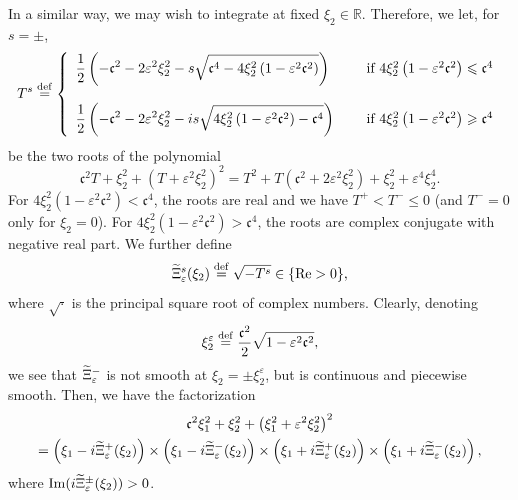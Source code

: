 \documentclass[AHL,Unicode,longabstracts,published]{cedram}
\newcommand*\R{\mathbb R}
\newcommand*\ddef{\stackrel{\rm def}{=}}
\newcommand{\Imm}{\mathrm{Im}}
\newcommand{\Rel}{\mathrm{Re}}
\newcommand*\ds{\displaystyle}
\newcommand*\cs{{\mathfrak c}}
\newcommand*\gs{\geqslant }
\newcommand*\ls{\leqslant }
\newcommand*\e{\varepsilon}
\renewcommand*\t{\tilde}
\let\oldtilde\tilde
\renewcommand*{\tilde}[1]{\mathchoice{\widetilde{#1}}{\widetilde{#1}}{\oldtilde{#1}}{\oldtilde{#1}}}
\begin{document}
In a similar way, we may wish to integrate at fixed $ \xi_2 \in \R $. Therefore, we let, for $ s = \pm $,
\[
T^s \ddef
\left\{
\begin{array}{ll}
\ds{ \frac{1}{2} \left(- \cs^2 - 2 \e^2 \xi_2^2 - s \sqrt{ \cs^4- 4 \xi_2^2 \left(1 - \e^2 \cs^2\right) } \right)} & \quad \text{ if } 4 \xi_2^2 \left(1 - \e^2 \cs^2\right) \ls \cs^4
\\ \ \\
\ds{ \frac{1}{2} \left(- \cs^2 - 2 \e^2 \xi_2^2 - i s \sqrt{ 4 \xi_2^2 \left(1 - \e^2 \cs^2\right) - \cs^4 } \right)} & \quad \text{ if } 4 \xi_2^2 \left(1 - \e^2 \cs^2\right) \gs \cs^4
\end{array}\right.
\]
be the two roots of the polynomial
\[
\cs^2 T + \xi_2^2 + \left(T + \e^2 \xi_2^2\right)^2 = T^2 + T \left(\cs^2 + 2 \e^2 \xi_2^2\right) + \xi_2^2 + \e^4 \xi_2^4.
\]
For $ 4 \xi_2^2 (1 - \e^2 \cs^2) < \cs^4 $, the roots are real and we have $ T^+ < T^- \ls 0 $ (and $ T^- = 0 $ only for $ \xi_2 = 0 $). For $ 4 \xi_2^2 (1 - \e^2 \cs^2) > \cs^4 $, the roots are complex conjugate with negative real part. We further define
\[
\t\Xi_\e^s (\xi_2) \ddef \sqrt{ - T^s } \in \{ \Rel > 0 \},
\]
where $ \sqrt{\cdot } $ is the principal square root of complex numbers. Clearly, denoting
\[
\xi_2^\e \ddef \frac{\cs^2}{2} \sqrt{ 1 - \e^2 \cs^2 },
\]
we see that $ \t\Xi_\e^- $ is not smooth at $ \xi_2 = \pm \xi_2^\e $, but is continuous and piecewise smooth. Then, we have the factorization
\begin{multline*}
\cs^2 \xi_1^2 + \xi_2^2 + \left(\xi_1^2 + \e^2 \xi_2^2\right)^2\\
= \left(\xi_1 - i \t\Xi_\e^+ (\xi_2)\right) \times \left(\xi_1 - i \t\Xi_\e^- (\xi_2)\right)
\times \left(\xi_1 + i \t\Xi_\e^+ (\xi_2)\right) \times \left(\xi_1 + i \t\Xi_\e^- (\xi_2)\right),
\end{multline*}
where $ {\Imm} (i \t\Xi_\e^\pm (\xi_2)) > 0 $.
\end{document}
